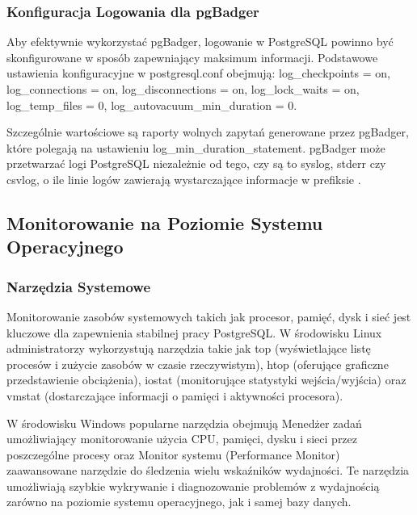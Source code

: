 \documentclass[letterpaper,10pt,polish]{sphinxmanual}
\begin{document}
\subsubsection{Konfiguracja Logowania dla pgBadger}
\label{\detokenize{rozdzial2/repo-wspolne/index:konfiguracja-logowania-dla-pgbadger}}
\sphinxAtStartPar
Aby efektywnie wykorzystać pgBadger, logowanie w PostgreSQL powinno być skonfigurowane w sposób zapewniający maksimum informacji. Podstawowe ustawienia konfiguracyjne w postgresql.conf obejmują: log\_checkpoints = on, log\_connections = on, log\_disconnections = on, log\_lock\_waits = on, log\_temp\_files = 0, log\_autovacuum\_min\_duration = 0.

\sphinxAtStartPar
Szczególnie wartościowe są raporty wolnych zapytań generowane przez pgBadger, które polegają na ustawieniu log\_min\_duration\_statement. pgBadger może przetwarzać logi PostgreSQL niezależnie od tego, czy są to syslog, stderr czy csvlog, o ile linie logów zawierają wystarczające informacje w prefiksie .


\subsection{Monitorowanie na Poziomie Systemu Operacyjnego}
\label{\detokenize{rozdzial2/repo-wspolne/index:monitorowanie-na-poziomie-systemu-operacyjnego}}

\subsubsection{Narzędzia Systemowe}
\label{\detokenize{rozdzial2/repo-wspolne/index:narzedzia-systemowe}}
\sphinxAtStartPar
Monitorowanie zasobów systemowych takich jak procesor, pamięć, dysk i sieć jest kluczowe dla zapewnienia stabilnej pracy PostgreSQL. W środowisku Linux administratorzy wykorzystują narzędzia takie jak top (wyświetlające listę procesów i zużycie zasobów w czasie rzeczywistym), htop (oferujące graficzne przedstawienie obciążenia), iostat (monitorujące statystyki wejścia/wyjścia) oraz vmstat (dostarczające informacji o pamięci i aktywności procesora).

\sphinxAtStartPar
W środowisku Windows popularne narzędzia obejmują Menedżer zadań umożliwiający monitorowanie użycia CPU, pamięci, dysku i sieci przez poszczególne procesy oraz Monitor systemu (Performance Monitor) \sphinxhyphen{} zaawansowane narzędzie do śledzenia wielu wskaźników wydajności. Te narzędzia umożliwiają szybkie wykrywanie i diagnozowanie problemów z wydajnością zarówno na poziomie systemu operacyjnego, jak i samej bazy danych.
\end{document}
